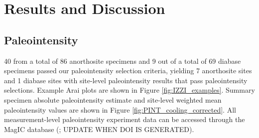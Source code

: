 \documentclass[draft]{agujournal2019}
\begin{document}
\section*{Results and Discussion}
\subsection*{Paleointensity}

40 from a total of 86 anorthosite specimens and 9 out of a total of 69 diabase specimens passed our paleointensity selection criteria, yielding 7 anorthosite sites and 1 diabase sites with site-level paleointensity results that pass paleointensity selections. Example Arai plots are shown in Figure \ref{fig:IZZI_examples}. Summary specimen absolute paleointensity estimate and site-level weighted mean paleointensity values are shown in Figure \ref{fig:PINT_cooling_corrected}. All measurement-level paleointensity experiment data can be accessed through the MagIC database (\url{}; UPDATE WHEN DOI IS GENERATED). 
\end{document}
